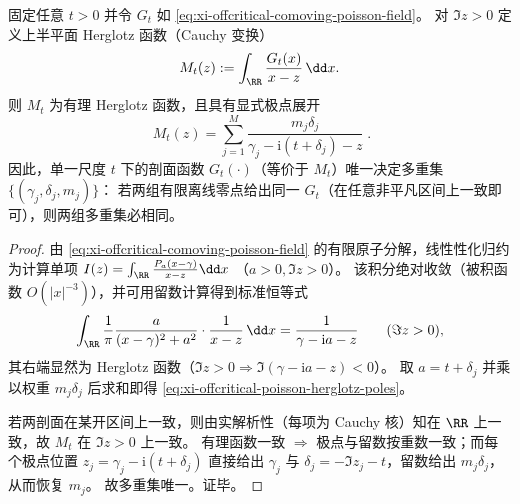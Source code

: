 \begin{theorem}\label{thm:xi-offcritical-poisson-herglotz-inversion}
固定任意 \(t>0\) 并令 \(G_t\) 如 \eqref{eq:xi-offcritical-comoving-poisson-field}。
对 \(\Im z>0\) 定义上半平面 Herglotz 函数（Cauchy 变换）
\[
M_t(z):=\int_{\RR}\frac{G_t(x)}{x-z}\,\dd x.
\]
则 \(M_t\) 为有理 Herglotz 函数，且具有显式极点展开
\begin{equation}\label{eq:xi-offcritical-poisson-herglotz-poles}
\boxed{\;
M_t(z)
=\sum_{j=1}^{M}\frac{m_j\delta_j}{\gamma_j-\mathrm{i}(t+\delta_j)-z}
\; }.
\end{equation}
因此，单一尺度 \(t\) 下的剖面函数 \(G_t(\cdot)\)（等价于 \(M_t\)）唯一决定多重集 \(\{(\gamma_j,\delta_j,m_j)\}\)：
若两组有限离线零点给出同一 \(G_t\)（在任意非平凡区间上一致即可），则两组多重集必相同。
\end{theorem}

\begin{proof}
由 \eqref{eq:xi-offcritical-comoving-poisson-field} 的有限原子分解，线性性化归约为计算单项
\(
I(z)=\int_{\RR}\frac{P_a(x-\gamma)}{x-z}\dd x
\)
（\(a>0,\Im z>0\)）。
该积分绝对收敛（被积函数 \(O(|x|^{-3})\)），并可用留数计算得到标准恒等式
\[
\int_{\RR}\frac{1}{\pi}\frac{a}{(x-\gamma)^2+a^2}\cdot \frac{1}{x-z}\,\dd x
=\frac{1}{\gamma-\mathrm{i}a-z}\qquad(\Im z>0),
\]
其右端显然为 Herglotz 函数（\(\Im z>0\Rightarrow \Im(\gamma-\mathrm{i}a-z)<0\)）。
取 \(a=t+\delta_j\) 并乘以权重 \(m_j\delta_j\) 后求和即得 \eqref{eq:xi-offcritical-poisson-herglotz-poles}。
\par
若两剖面在某开区间上一致，则由实解析性（每项为 Cauchy 核）知在 \(\RR\) 上一致，故 \(M_t\) 在 \(\Im z>0\) 上一致。
有理函数一致 \(\Rightarrow\) 极点与留数按重数一致；而每个极点位置 \(z_j=\gamma_j-\mathrm{i}(t+\delta_j)\) 直接给出 \(\gamma_j\) 与 \(\delta_j=-\Im z_j-t\)，留数给出 \(m_j\delta_j\)，从而恢复 \(m_j\)。
故多重集唯一。证毕。
\end{proof}


